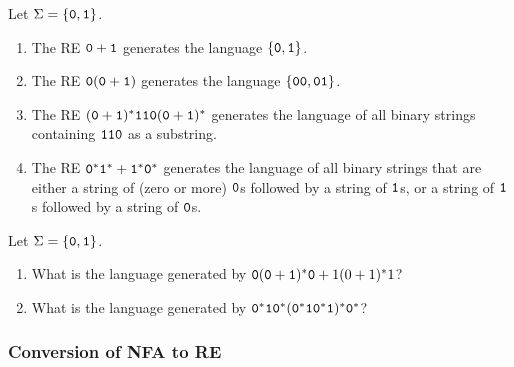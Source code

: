 \begin{Example} Let $\Sigma = \{\texttt 0, \texttt 1\}$.
\begin{enumerate}
\item The RE $\texttt 0 + \texttt 1$ generates the language $\{\texttt 0, \texttt 1\}$.
\item The RE $\texttt 0(\texttt 0 + \texttt 1)$ generates the language $\{\texttt{00}, \texttt{01}\}$.
\item The RE $(\texttt 0 + \texttt 1)^*\texttt{110}(\texttt 0 + \texttt 1)^*$ generates the language of all binary strings containing $\texttt{110}$ as a substring.
\item The RE $\texttt 0^* \texttt 1^* + \texttt 1^* \texttt 0^*$ generates the language of all binary strings that are either a string of (zero or more) $\texttt 0$s followed by a string of $\texttt 1$s, or a string of $\texttt 1$s followed by a string of $\texttt 0$s.
\end{enumerate}
\end{Example}

\begin{Exercise} Let $\Sigma = \{\texttt 0, \texttt 1\}$.
\begin{enumerate}
\item What is the language generated by $\texttt 0 (\texttt 0 + \texttt 1)^* \texttt 0 + 1 (0 + 1)^* 1$?
\item What is the language generated by $\texttt 0^* \texttt 1 \texttt 0^*(\texttt 0^* \texttt 1 \texttt 0^* \texttt 1)^* \texttt 0^*$?
\end{enumerate}
\end{Exercise}


\subsubsection{Conversion of NFA to RE}\label{sububsec:NFAtoRE}

